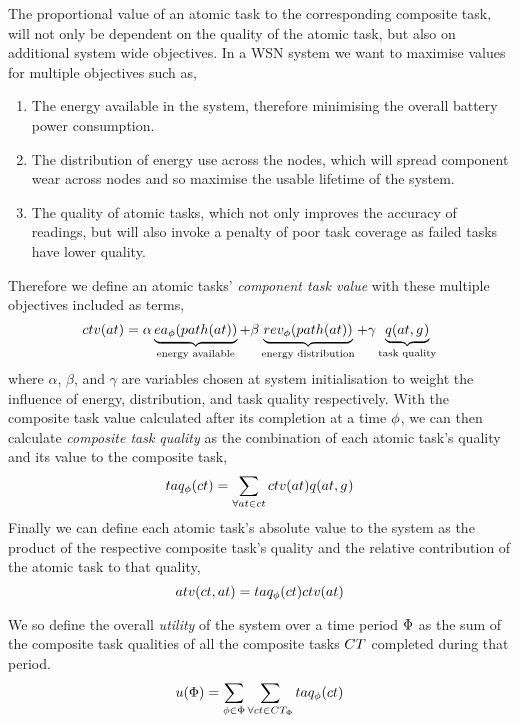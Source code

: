 The proportional value of an atomic task to the corresponding composite task, will not only be dependent on the quality of the atomic task, but also on additional system wide objectives. In a WSN system we want to maximise values for multiple objectives such as,
\begin{enumerate}
	\item The energy available in the system, therefore minimising the overall battery power consumption. 
	\item The distribution of energy use across the nodes, which will spread component wear across nodes and so maximise the usable lifetime of the system.
	\item The quality of atomic tasks, which not only improves the accuracy of readings, but will also invoke a penalty of poor task coverage as failed tasks have lower quality. 
\end{enumerate}
Therefore we define an atomic tasks' \textit{component task value} with these multiple objectives included as terms,
\begin{equation}
	\label{eq:ctv}
	\functionCompositeTaskValue{}{} = 
	\alpha\underbrace{\functionEnergyAvailable{\functionTaskArc{}{}}{}}_{\text{energy available}}
	+ \beta\underbrace{\functionEnergyVariability{\functionTaskArc{}{}}{}}_{\text{energy distribution}}
	+ 
	\gamma\underbrace{\functionAtomicTaskQualitySignature{}{}}_{\text{task quality}}
\end{equation}
where $\alpha$, $\beta$, and $\gamma$ are variables chosen at system initialisation to weight the influence of energy, distribution, and task quality respectively. With the composite task value calculated after its completion  at a time $\phi$, we can then calculate \textit{composite task quality} as the combination of each atomic task's quality and its value to the composite task,
\begin{equation}
\functionCompositeTaskQuality{}{} = \sum\limits_{\forall \varAtomicTask{}{} \in \varCompositeTask{}{}}
\functionCompositeTaskValue{}{}\functionAtomicTaskQualitySignature{}{}	
\end{equation}
Finally we can define each atomic task's absolute value to the system as the product of the respective composite task's quality and the relative contribution of the atomic task to that quality,
\begin{equation}
	\functionTaskAbsoluteValue{}{} = 
	\functionCompositeTaskQuality{}{}\functionCompositeTaskValue{}{}
\end{equation}

We so define the overall \textit{ utility} of the system over a time period $\Phi$ as the sum of the composite task qualities of all the composite tasks $\setCompositeTask{}{}$ completed during that period.
	\begin{equation}
		\label{eq:system_utility}
		\functionSystemUtility{}{} = \sum\limits_{\varTime{}{} \in \setTime{}{}}
		\sum\limits_{\forall \varCompositeTask{}{} \in \setCompositeTask{\setTime{}{}}{}}
		\functionCompositeTaskQuality{}{}
	\end{equation}